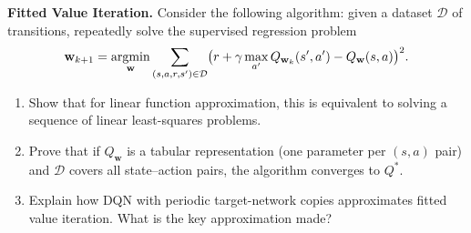 \begin{exercise}
\label{ex:fitted-vi}
\textbf{Fitted Value Iteration.} Consider the following algorithm: given a dataset $\mathcal{D}$
of transitions, repeatedly solve the supervised regression problem
\[
\mathbf{w}_{k+1} = \operatorname*{argmin}_\mathbf{w} \sum_{(s,a,r,s') \in \mathcal{D}}
\bigl(r + \gamma \max_{a'} Q_{\mathbf{w}_k}(s', a') - Q_\mathbf{w}(s, a)\bigr)^2.
\]
\begin{enumerate}
\item Show that for linear function approximation, this is equivalent to solving a sequence of
  linear least-squares problems.
\item Prove that if $Q_\mathbf{w}$ is a tabular representation (one parameter per $(s,a)$ pair)
  and $\mathcal{D}$ covers all state--action pairs, the algorithm converges to $Q^*$.
\item Explain how DQN with periodic target-network copies approximates fitted value iteration.
  What is the key approximation made?
\end{enumerate}
\end{exercise}
